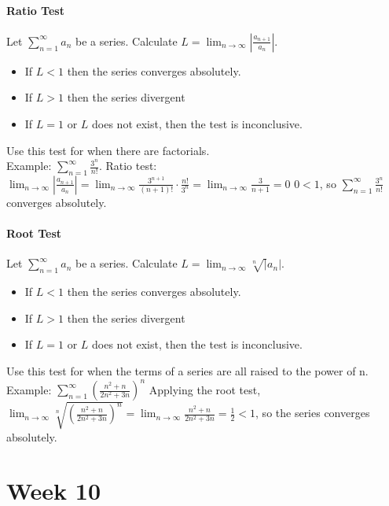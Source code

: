 \documentclass[10pt,letter]{article}
\begin{document}
\paragraph{Ratio Test} Let $\sum_{n=1}^\infty a_n$ be a series. Calculate $L = \lim_{n\rightarrow\infty}|\frac{a_{n+1}}{a_n}|$. \begin{itemize}
    \item If $L < 1$ then the series converges absolutely. 
    \item If $L > 1$ then the series divergent
    \item If $L = 1$ or $L$ does not exist, then the test is inconclusive.
\end{itemize} Use this test for when there are factorials.  \\ 
Example: $\sum_{n=1}^\infty \frac{3^n}{n!}$. Ratio test: $\lim_{n\rightarrow\infty}|\frac{a_{n+1}}{a_n}| = \lim_{n\rightarrow\infty}\frac{3^{n+1}}{(n+1)!}\cdot \frac{n!}{3^n}=\lim_{n\rightarrow\infty}\frac{3}{n+1}=0$ $0<1$, so $\sum_{n=1}^\infty\frac{3^n}{n!}$ converges absolutely. 

\paragraph{Root Test} Let $\sum_{n=1}^\infty a_n$ be a series. Calculate $L = \lim_{n\rightarrow\infty}\sqrt[n]|a_n|$. \begin{itemize}
    \item If $L < 1$ then the series converges absolutely. 
    \item If $L > 1$ then the series divergent
    \item If $L = 1$ or $L$ does not exist, then the test is inconclusive.
\end{itemize} Use this test for when the terms of a series are all raised to the power of n. \\ 
Example: $\sum_{n=1}^\infty\left(\frac{n^2+n}{2n^2+3n}\right)^n$ Applying the root test, $\lim_{n\rightarrow\infty}\sqrt[n]{\left(\frac{n^2+n}{2n^2+3n}\right)^n} = \lim_{n\rightarrow\infty}\frac{n^2+n}{2n^2+3n} = \frac{1}{2}<1$, so the series converges absolutely. 

\pagebreak

\section*{Week 10} 
\end{document}
